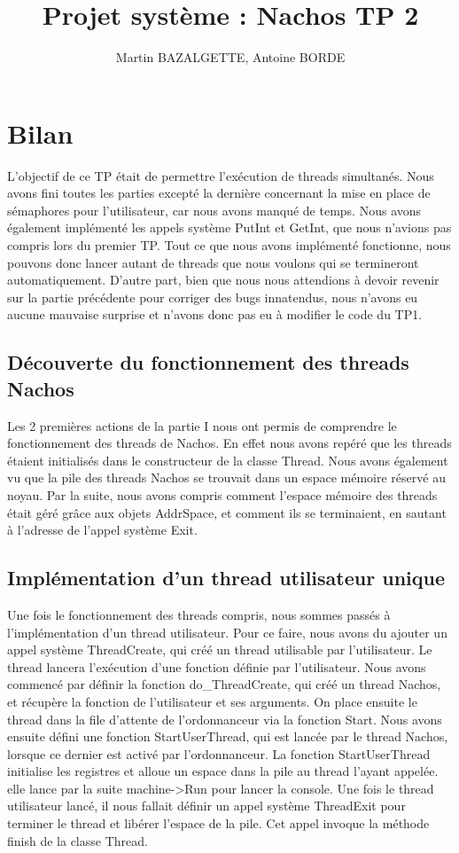 \documentclass[12pt]{article}
\begin{document}
\title{Projet système : Nachos TP 2}
\author{Martin BAZALGETTE, Antoine BORDE}
\maketitle

\newpage
\tableofcontents
\newpage

\section{Bilan}
L'objectif de ce TP était de permettre l'exécution de threads simultanés.
Nous avons fini toutes les parties excepté la dernière concernant la mise en place de sémaphores pour l'utilisateur, car nous avons manqué de temps.
Nous avons également implémenté les appels système PutInt et GetInt,
que nous n'avions pas compris lors du premier TP.
Tout ce que nous avons implémenté fonctionne, nous pouvons donc lancer autant de threads que nous voulons qui se termineront automatiquement.
D'autre part, bien que nous nous attendions à devoir revenir sur la partie précédente pour corriger des bugs innatendus, nous n'avons eu aucune mauvaise surprise et n'avons donc pas eu à modifier le code du TP1.

\subsection{Découverte du fonctionnement des threads Nachos}
Les 2 premières actions de la partie I nous ont permis de comprendre le fonctionnement des threads de Nachos. En effet nous avons repéré que les threads étaient initialisés dans le constructeur de la classe Thread. Nous avons également vu que la pile des threads Nachos se trouvait dans un espace mémoire réservé au noyau.
Par la suite, nous avons compris comment l'espace mémoire des threads était géré grâce aux objets AddrSpace, et comment ils se terminaient, en sautant à l'adresse de l'appel système Exit.

\subsection{Implémentation d'un thread utilisateur unique}
Une fois le fonctionnement des threads compris, nous sommes passés à l'implémentation d'un thread utilisateur.
Pour ce faire, nous avons du ajouter un appel système ThreadCreate, qui créé un thread utilisable par l'utilisateur. Le thread lancera l'exécution d'une fonction définie par l'utilisateur.
Nous avons commencé par définir la fonction do\_ThreadCreate, qui créé un thread Nachos, et récupère la fonction de l'utilisateur et ses arguments. On place ensuite le thread dans la file d'attente de l'ordonnanceur via la fonction Start.
Nous avons ensuite défini une fonction StartUserThread, qui est lancée par le thread Nachos, lorsque ce dernier est activé par l'ordonnanceur.
La fonction StartUserThread initialise les registres et alloue un espace dans la pile au thread l'ayant appelée. elle lance par la suite machine->Run pour lancer la console.
Une fois le thread utilisateur lancé, il nous fallait définir un appel système ThreadExit pour terminer le thread et libérer l'espace de la pile.
Cet appel invoque la méthode finish de la classe Thread.
\end{document}
